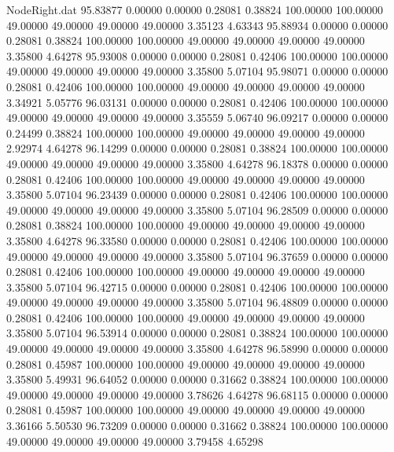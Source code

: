 \begin{filecontents}{NodeRight.dat}
  95.83877    0.00000    0.00000     0.28081    0.38824  100.00000  100.00000   49.00000   49.00000   49.00000   49.00000    3.35123    4.63343
  95.88934    0.00000    0.00000     0.28081    0.38824  100.00000  100.00000   49.00000   49.00000   49.00000   49.00000    3.35800    4.64278
  95.93008    0.00000    0.00000     0.28081    0.42406  100.00000  100.00000   49.00000   49.00000   49.00000   49.00000    3.35800    5.07104
  95.98071    0.00000    0.00000     0.28081    0.42406  100.00000  100.00000   49.00000   49.00000   49.00000   49.00000    3.34921    5.05776
  96.03131    0.00000    0.00000     0.28081    0.42406  100.00000  100.00000   49.00000   49.00000   49.00000   49.00000    3.35559    5.06740
  96.09217    0.00000    0.00000     0.24499    0.38824  100.00000  100.00000   49.00000   49.00000   49.00000   49.00000    2.92974    4.64278
  96.14299    0.00000    0.00000     0.28081    0.38824  100.00000  100.00000   49.00000   49.00000   49.00000   49.00000    3.35800    4.64278
  96.18378    0.00000    0.00000     0.28081    0.42406  100.00000  100.00000   49.00000   49.00000   49.00000   49.00000    3.35800    5.07104
  96.23439    0.00000    0.00000     0.28081    0.42406  100.00000  100.00000   49.00000   49.00000   49.00000   49.00000    3.35800    5.07104
  96.28509    0.00000    0.00000     0.28081    0.38824  100.00000  100.00000   49.00000   49.00000   49.00000   49.00000    3.35800    4.64278
  96.33580    0.00000    0.00000     0.28081    0.42406  100.00000  100.00000   49.00000   49.00000   49.00000   49.00000    3.35800    5.07104
  96.37659    0.00000    0.00000     0.28081    0.42406  100.00000  100.00000   49.00000   49.00000   49.00000   49.00000    3.35800    5.07104
  96.42715    0.00000    0.00000     0.28081    0.42406  100.00000  100.00000   49.00000   49.00000   49.00000   49.00000    3.35800    5.07104
  96.48809    0.00000    0.00000     0.28081    0.42406  100.00000  100.00000   49.00000   49.00000   49.00000   49.00000    3.35800    5.07104
  96.53914    0.00000    0.00000     0.28081    0.38824  100.00000  100.00000   49.00000   49.00000   49.00000   49.00000    3.35800    4.64278
  96.58990    0.00000    0.00000     0.28081    0.45987  100.00000  100.00000   49.00000   49.00000   49.00000   49.00000    3.35800    5.49931
  96.64052    0.00000    0.00000     0.31662    0.38824  100.00000  100.00000   49.00000   49.00000   49.00000   49.00000    3.78626    4.64278
  96.68115    0.00000    0.00000     0.28081    0.45987  100.00000  100.00000   49.00000   49.00000   49.00000   49.00000    3.36166    5.50530
  96.73209    0.00000    0.00000     0.31662    0.38824  100.00000  100.00000   49.00000   49.00000   49.00000   49.00000    3.79458    4.65298

\end{filecontents}
